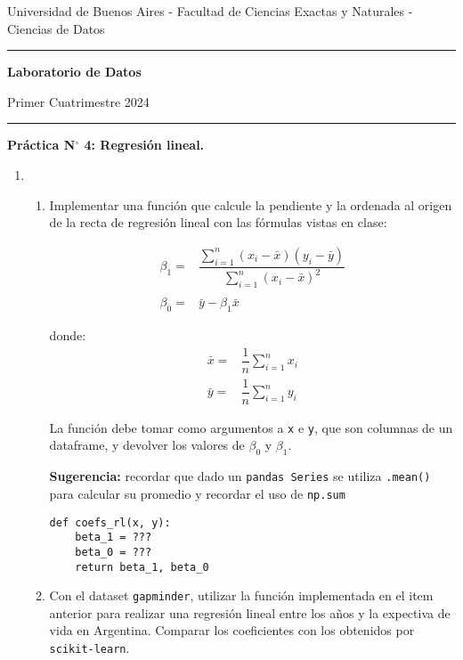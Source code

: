 \documentclass[a4paper,11pt]{article}
\theoremstyle{definition}
\begin{document}
\centerline{{\small Universidad de Buenos Aires - Facultad de Ciencias Exactas y Naturales - Ciencias de Datos}}

\vskip 0.2cm

\hrule

\vskip 0.2cm

 \centerline{{\bf\Large{\sc Laboratorio de Datos}}}

 \vskip 0.2cm

 \centerline{\ttfamily Primer Cuatrimestre 2024}

\vskip 0.2cm

 \hrule

 \bigskip
 \centerline{\bf Práctica N$^\circ$ 4: Regresión lineal.}
 \bigskip



\begin{enumerate}[resume]
\item 
\begin{enumerate}
    \item Implementar una función que calcule la pendiente y la ordenada al origen de la recta de regresión lineal con las fórmulas vistas en clase:

     \[
     \begin{array}{rl}
          {\beta}_1 = & \dfrac{\displaystyle\sum_{i=1}^n(x_i - \bar{x})(y_i - \bar{y})}{\displaystyle\sum_{i=1}^n(x_i - \bar{x})^2}  \\[1em]
          {\beta}_0 = & \bar{y} - \hat{\beta}_1\bar{x}
     \end{array}
     \]

          donde:
     \[
     \begin{array}{rl}
          \bar{x} =& \dfrac{1}{n} \displaystyle\sum_{i=1}^n x_i  \\
          \bar{y} =& \dfrac{1}{n} \displaystyle\sum_{i=1}^n y_i
     \end{array}
     \]


    La función debe tomar como argumentos a \texttt{x} e \texttt{y}, que son columnas de un dataframe, y devolver los valores de $\beta_0$ y $\beta_1$. 
    
    \textbf{Sugerencia:} recordar que dado un \texttt{pandas Series} se utiliza \texttt{.mean()} para calcular su promedio y recordar el uso de \texttt{np.sum}
    \vspace{0.2cm} 
\begin{lstlisting}
def coefs_rl(x, y):
    beta_1 = ???
    beta_0 = ???
    return beta_1, beta_0
\end{lstlisting}
    \item Con el dataset \texttt{gapminder}, utilizar la función implementada en el item anterior para realizar una regresión lineal entre los años y la expectiva de vida en Argentina. Comparar los coeficientes con los obtenidos por \texttt{scikit-learn}.
    \vspace{0.2cm} 
    

\end{enumerate}
\end{enumerate}
\end{document}
